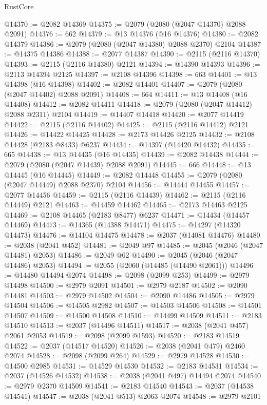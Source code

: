 \begin{lexlean}{RustCore}
\begin{coremodule}
@14370 := @2082 @14369
@14375 := @2079 (@2080 (@2047 @14370) @2088 @2091)
@14376 := 662
@14379 := @13 @14376 (@16 @14376)
@14380 := @2082 @14379
@14386 := @2079 (@2080 (@2047 @14380) @2088 @2370) @2104
@14387 := @14375 @14386
@14388 := @2077 @14387
@14390 := @2115 (@2116 @14370)
@14393 := @2115 (@2116 @14380) @2121
@14394 := @14390 @14393
@14396 := @2113 @14394 @2125
@14397 := @2108 @14396
@14398 := 663
@14401 := @13 @14398 (@16 @14398)
@14402 := @2082 @14401
@14407 := @2079 (@2080 (@2047 @14402) @2088 @2091)
@14408 := 664
@14411 := @13 @14408 (@16 @14408)
@14412 := @2082 @14411
@14418 := @2079 (@2080 (@2047 @14412) @2088 @2311) @2104
@14419 := @14407 @14418
@14420 := @2077 @14419
@14422 := @2115 (@2116 @14402)
@14425 := @2115 (@2116 @14412) @2121
@14426 := @14422 @14425
@14428 := @2173 @14426 @2125
@14432 := @2108 @14428 (@2183 @8433) @6237
@14434 := @14397 (@14420 @14432)
@14435 := 665
@14438 := @13 @14435 (@16 @14435)
@14439 := @2082 @14438
@14444 := @2079 (@2080 (@2047 @14439) @2088 @2091)
@14445 := 666
@14448 := @13 @14445 (@16 @14445)
@14449 := @2082 @14448
@14455 := @2079 (@2080 (@2047 @14449) @2088 @2370) @2104
@14456 := @14444 @14455
@14457 := @2077 @14456
@14459 := @2115 (@2116 @14439)
@14462 := @2115 (@2116 @14449) @2121
@14463 := @14459 @14462
@14465 := @2173 @14463 @2125
@14469 := @2108 @14465 (@2183 @8477) @6237
@14471 := @14434 (@14457 @14469)
@14473 := @14365 (@14388 @14471)
@14475 := @14297 (@14320 @14473)
@14476 := @14104 @14475
@14478 := @2037 (@14081 @14476)
@14480 := @2038 (@2041 @452)
@14481 := @2049 @97
@14485 := @2045 (@2046 (@2047 @14481) @2053)
@14486 := @2049 @62
@14490 := @2045 (@2046 (@2047 @14486) @2053)
@14494 := @2055 (@2060 (@14485 (@14490 @2061)))
@14496 := @14480 @14494 @2074
@14498 := @2098 (@2099 @253)
@14499 := @2979 @14498
@14500 := @2979 @2091
@14501 := @2979 @2187
@14502 := @2090 @14481
@14503 := @2979 @14502
@14504 := @2090 @14486
@14505 := @2979 @14504
@14506 := @14505 @2982
@14507 := @14503 @14506
@14508 := @14501 @14507
@14509 := @14500 @14508
@14510 := @14499 @14509
@14511 := @2183 @14510
@14513 := @2037 (@14496 @14511)
@14517 := @2038 (@2041 @457) @2061 @2053
@14519 := @2098 (@2099 @1593)
@14520 := @2183 @14519
@14522 := @2037 (@14517 @14520)
@14526 := @2038 (@2041 @479) @2460 @2074
@14528 := @2098 (@2099 @264)
@14529 := @2979 @14528
@14530 := @14500 @2985
@14531 := @14529 @14530
@14532 := @2183 @14531
@14534 := @2037 (@14526 @14532)
@14538 := @2038 (@2041 @497) @14494 @2074
@14540 := @2979 @2370 @14509
@14541 := @2183 @14540
@14543 := @2037 (@14538 @14541)
@14547 := @2038 (@2041 @513) @2063 @2074
@14548 := @2979 @2101

\end{coremodule}
\end{lexlean}
